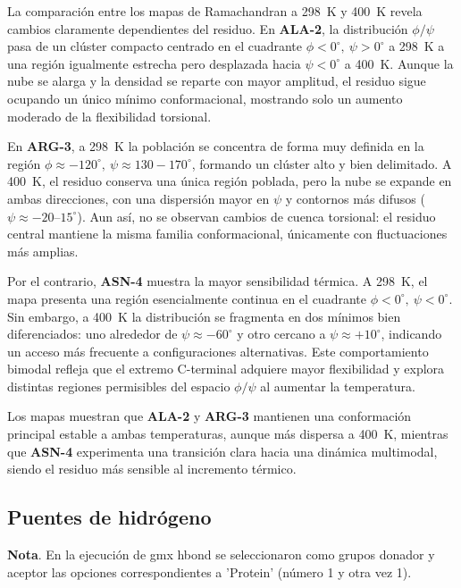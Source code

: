 \documentclass[12pt,a4paper]{article}
\begin{document}
La comparación entre los mapas de Ramachandran a \SI{298}{K} y \SI{400}{K} revela
cambios claramente dependientes del residuo. En \textbf{ALA-2}, la distribución
\(\phi/\psi\) pasa de un clúster compacto centrado en el cuadrante
\(\phi<0^\circ,\ \psi>0^\circ\) a \SI{298}{K} a una región igualmente estrecha pero
desplazada hacia \(\psi<0^\circ\) a \SI{400}{K}. Aunque la nube se alarga y la
densidad se reparte con mayor amplitud, el residuo sigue ocupando un único mínimo
conformacional, mostrando solo un aumento moderado de la flexibilidad torsional.

En \textbf{ARG-3}, a \SI{298}{K} la población se concentra de forma muy definida en la
región \(\phi\approx -120^\circ,\ \psi\approx 130{-}170^\circ\), formando un clúster alto y
bien delimitado. A \SI{400}{K}, el residuo conserva una única región poblada, pero la nube
se expande en ambas direcciones, con una dispersión mayor en \(\psi\) y contornos más
difusos ($\psi\approx -20$--$15^\circ$). Aun así, no se observan cambios de cuenca torsional: el residuo central
mantiene la misma familia conformacional, únicamente con fluctuaciones más amplias.

Por el contrario, \textbf{ASN-4} muestra la mayor sensibilidad térmica. A \SI{298}{K}, el mapa
presenta una región esencialmente continua en el cuadrante
\(\phi<0^\circ,\ \psi<0^\circ\). Sin embargo, a \SI{400}{K} la distribución se fragmenta en
dos mínimos bien diferenciados: uno alrededor de \(\psi\approx -60^\circ\) y otro cercano a
\(\psi\approx +10^\circ\), indicando un acceso más frecuente a configuraciones alternativas.
Este comportamiento bimodal refleja que el extremo C-terminal adquiere mayor
flexibilidad y explora distintas regiones permisibles del espacio \(\phi/\psi\) al aumentar
la temperatura.

Los mapas muestran que \textbf{ALA-2} y \textbf{ARG-3} mantienen una conformación
principal estable a ambas temperaturas, aunque más dispersa a \SI{400}{K}, mientras que
\textbf{ASN-4} experimenta una transición clara hacia una dinámica multimodal, siendo el
residuo más sensible al incremento térmico.

\subsection{Puentes de hidrógeno}

\noindent\textbf{Nota}. En la ejecución de gmx hbond se seleccionaron como grupos donador y aceptor las opciones correspondientes a 'Protein' (número 1 y otra vez 1).
\end{document}
